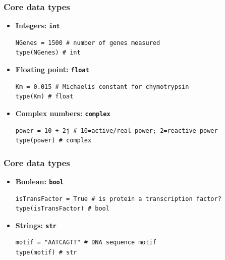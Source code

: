 \documentclass[pdf]{beamer}
\begin{document}
\begin{frame}[fragile]
\frametitle{Core data types}

\begin{itemize}\addtolength{\itemsep}{0.5\baselineskip}

\item<1-> \textbf{Integers: \texttt{int}}\\
\begin{lstlisting}[style=python]
NGenes = 1500 # number of genes measured
type(NGenes) # int
\end{lstlisting}
	
\item<2-> \textbf{Floating point: \texttt{float}}
\begin{lstlisting}[style=python]
Km = 0.015 # Michaelis constant for chymotrypsin
type(Km) # float
\end{lstlisting}
	
\item<3-> \textbf{Complex numbers: \texttt{complex}}
\begin{lstlisting}[style=python]
power = 10 + 2j # 10=active/real power; 2=reactive power
type(power) # complex
\end{lstlisting}

\end{itemize}

\end{frame}

\begin{frame}[fragile]
\frametitle{Core data types}

\begin{itemize}\addtolength{\itemsep}{0.5\baselineskip}

\item<1-> \textbf{Boolean: \texttt{bool}}
\begin{lstlisting}[style=python]
isTransFactor = True # is protein a transcription factor?
type(isTransFactor) # bool
\end{lstlisting}

\item<2-> \textbf{Strings: \texttt{str}}
\begin{lstlisting}[style=python]
motif = "AATCAGTT" # DNA sequence motif
type(motif) # str
\end{lstlisting}

\end{itemize}

\end{frame}
\end{document}

